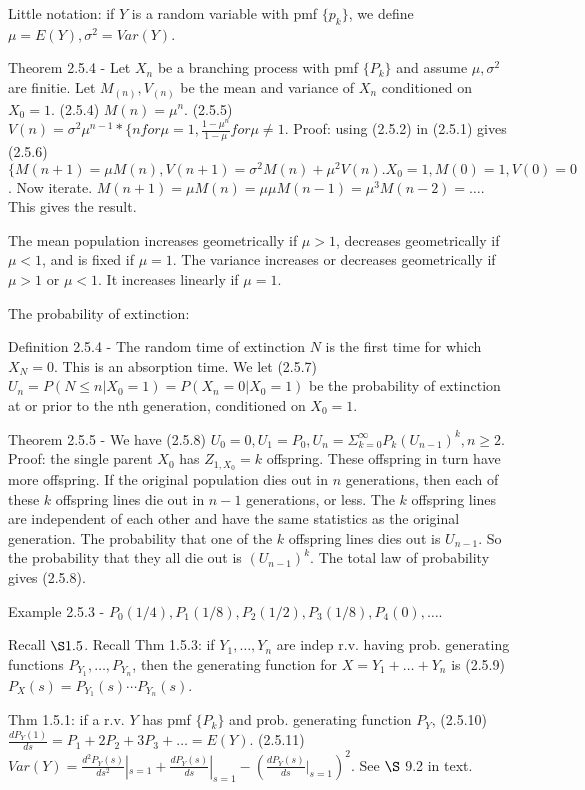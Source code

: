 \documentclass{article}
\begin{document}
Little notation: if $Y$ is a random variable with pmf $\{p_k\}$, we define $\mu = E(Y), \sigma^2 = Var(Y)$.

Theorem 2.5.4 - Let $X_n$ be a branching process with pmf $\{P_k\}$ and assume $\mu, \sigma^2$ are finitie. Let $M_{(n)}, V_{(n)}$ be the mean and variance of $X_n$ conditioned on $X_0 = 1$. (2.5.4) $M(n) = \mu^n$. (2.5.5) $V(n) = \sigma^2 \mu^{n-1} * \{n for \mu = 1, \frac{1 - \mu^n}{1 - \mu} for \mu \ne 1$. Proof: using (2.5.2) in (2.5.1) gives (2.5.6) $\{M(n+1) = \mu M(n), V(n+1) = \sigma^2 M(n) + \mu^2 V(n). X_0 = 1, M(0) = 1, V(0) = 0$. Now iterate. $M(n+1) = \mu M(n) = \mu \mu M(n - 1) = \mu^3 M(n-2) = \dots$. This gives the result.

The mean population increases geometrically if $\mu > 1$, decreases geometrically if $\mu < 1$, and is fixed if $\mu = 1$. The variance increases or decreases geometrically if $\mu > 1$ or $\mu < 1$. It increases linearly if $\mu = 1$.

The probability of extinction:

Definition 2.5.4 - The random time of extinction $N$ is the first time for which $X_N = 0$. This is an absorption time. We let (2.5.7) $U_n = P(N \le n | X_0 = 1) = P(X_n = 0 | X_0 = 1)$ be the probability of extinction at or prior to the nth generation, conditioned on $X_0 = 1$.

Theorem 2.5.5 - We have (2.5.8) $U_0 = 0, U_1 = P_0, U_n = \Sigma_{k = 0}^{\infty} P_k (U_{n-1})^k, n \ge 2$. Proof: the single parent $X_0$ has $Z_{1, X_0} = k$ offspring. These offspring in turn have more offspring. If the original population dies out in $n$ generations, then each of these $k$ offspring lines die out in $n - 1$ generations, or less. The $k$ offspring lines are independent of each other and have the same statistics as the original generation. The probability that one of the $k$ offspring lines dies out is $U_{n-1}$. So the probability that they all die out is $(U_{n-1})^k$. The total law of probability gives (2.5.8).

Example 2.5.3 - $P_0 (1/4), P_1 (1/8), P_2 (1/2), P_3 (1/8), P_4 (0), \dots$.

Recall $\S 1.5$. Recall Thm 1.5.3: if $Y_1, \dots, Y_n$ are indep r.v. having prob. generating functions $P_{Y_1}, \dots, P_{Y_n}$, then the generating function for $X = Y_1 + \dots + Y_n$ is (2.5.9) $P_X(s) = P_{Y_1}(s) \cdots P_{Y_n}(s)$.

Thm 1.5.1: if a r.v. $Y$ has pmf $\{P_k\}$ and prob. generating function $P_Y$, (2.5.10) $\frac{d P_Y(1)}{ds} = P_1 + 2 P_2 + 3 P_3 + \dots = E(Y)$. (2.5.11) $Var(Y) = \frac{d^2 P_Y(s)}{ds^2}|_{s=1} + \frac{d P_Y(s)}{ds}|_{s=1} - (\frac{dP_Y(s)}{ds}|_{s=1})^2$. See $\S$ 9.2 in text.
\end{document}
